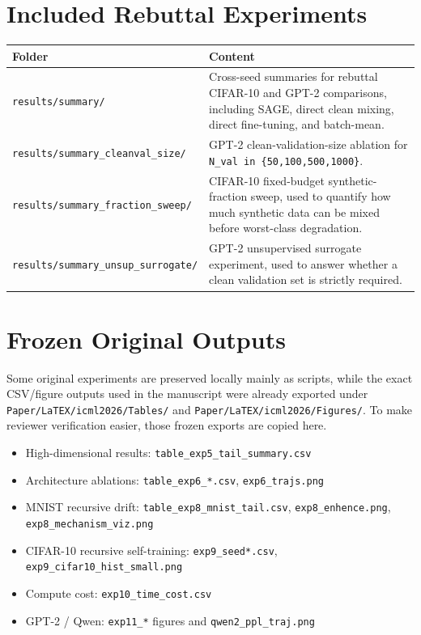 \documentclass[11pt]{article}
\begin{document}
\section*{Included Rebuttal Experiments}
\begin{tabularx}{\linewidth}{>{\raggedright\arraybackslash}p{3.2cm} X}
\toprule
\textbf{Folder} & \textbf{Content} \\
\midrule
\texttt{results/summary/} & Cross-seed summaries for rebuttal CIFAR-10 and GPT-2 comparisons, including SAGE, direct clean mixing, direct fine-tuning, and batch-mean. \\
\texttt{results/summary\_cleanval\_size/} & GPT-2 clean-validation-size ablation for \texttt{N\_val in \{50,100,500,1000\}}. \\
\texttt{results/summary\_fraction\_sweep/} & CIFAR-10 fixed-budget synthetic-fraction sweep, used to quantify how much synthetic data can be mixed before worst-class degradation. \\
\texttt{results/summary\_unsup\_surrogate/} & GPT-2 unsupervised surrogate experiment, used to answer whether a clean validation set is strictly required. \\
\bottomrule
\end{tabularx}

\section*{Frozen Original Outputs}
Some original experiments are preserved locally mainly as scripts, while the exact CSV/figure outputs used in
the manuscript were already exported under \texttt{Paper/LaTEX/icml2026/Tables/} and
\texttt{Paper/LaTEX/icml2026/Figures/}. To make reviewer verification easier, those frozen exports are copied here.

\begin{itemize}[leftmargin=1.5em]
\item High-dimensional results: \texttt{table\_exp5\_tail\_summary.csv}
\item Architecture ablations: \texttt{table\_exp6\_*.csv}, \texttt{exp6\_trajs.png}
\item MNIST recursive drift: \texttt{table\_exp8\_mnist\_tail.csv}, \texttt{exp8\_enhence.png}, \texttt{exp8\_mechanism\_viz.png}
\item CIFAR-10 recursive self-training: \texttt{exp9\_seed*.csv}, \texttt{exp9\_cifar10\_hist\_small.png}
\item Compute cost: \texttt{exp10\_time\_cost.csv}
\item GPT-2 / Qwen: \texttt{exp11\_*} figures and \texttt{qwen2\_ppl\_traj.png}
\end{itemize}
\end{document}
